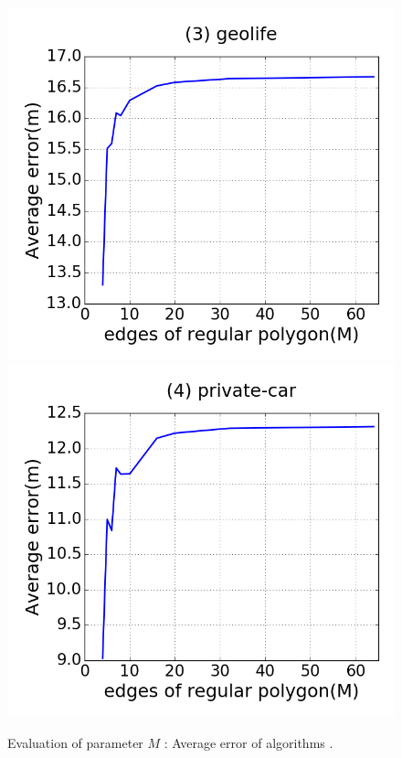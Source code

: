 \begin{figure}[tb!]
\includegraphics[scale = 0.24]{figures/Exp-M-error-geolife.png}
\includegraphics[scale = 0.24]{figures/Exp-M-error-private.png}
\vspace{-2ex}
\caption{\small Evaluation of parameter $M$ : Average error of algorithms \cist.}
\label{fig:m-error-cist}
\vspace{-1ex}
\end{figure}

